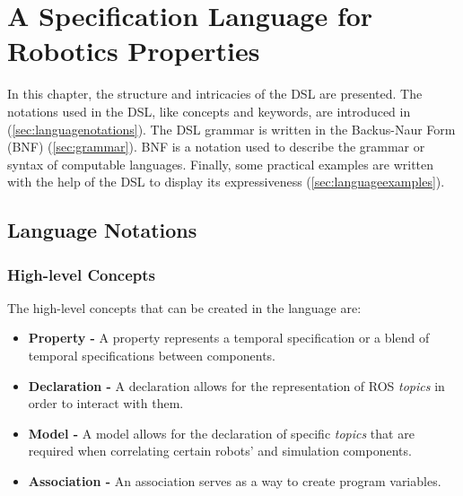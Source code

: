 \chapter{A Specification Language for Robotics Properties}
\label{chap:language}

In this chapter, the structure and intricacies of the DSL are presented. The notations used in the DSL, like concepts and keywords, are introduced in (\autoref{sec:languagenotations}). The DSL grammar is written in the Backus-Naur Form (BNF) (\autoref{sec:grammar}). BNF is a notation used to describe the grammar or syntax of computable languages. Finally, some practical examples are written with the help of the DSL to display its expressiveness (\autoref{sec:languageexamples}).


\section{Language Notations}
\label{sec:languagenotations}


\subsection{High-level Concepts}

The high-level concepts that can be created in the language are:

\begin{itemize}
\item \textbf{Property -} A property represents a temporal specification or a blend of temporal specifications between components.
\item \textbf{Declaration -} A declaration allows for the representation of ROS \textit{topics} in order to interact with them.
\item \textbf{Model -} A model allows for the declaration of specific \textit{topics} that are required when correlating certain robots' and simulation components.
\item \textbf{Association -} An association serves as a way to create program variables.
\end{itemize}


